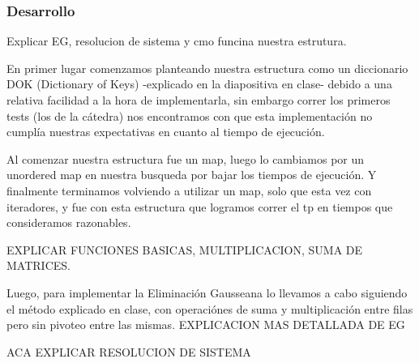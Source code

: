 \subsubsection*{Desarrollo}
Explicar EG, resolucion de sistema y cmo funcina nuestra estrutura.

\par En primer lugar comenzamos planteando nuestra estructura como un diccionario DOK (Dictionary of Keys) -explicado en la diapositiva en clase- debido a una relativa facilidad a la hora de implementarla, sin embargo correr los primeros tests (los de la cátedra) nos encontramos con que esta implementación no cumplía nuestras expectativas en cuanto al tiempo de ejecución.

\par Al comenzar nuestra estructura fue un map, luego lo cambiamos por un unordered map en nuestra busqueda por bajar los tiempos de ejecución. Y finalmente terminamos volviendo a utilizar un map, solo que esta vez con iteradores, y fue con esta estructura que logramos correr el tp en tiempos que consideramos razonables.

\par EXPLICAR FUNCIONES BASICAS, MULTIPLICACION, SUMA DE MATRICES.

\par Luego, para implementar la Eliminación Gausseana lo llevamos a cabo siguiendo el método explicado en clase, con operaciónes de suma y multiplicación entre filas pero sin pivoteo entre las mismas.
EXPLICACION MAS DETALLADA DE EG

\par ACA EXPLICAR RESOLUCION DE SISTEMA 

\par 